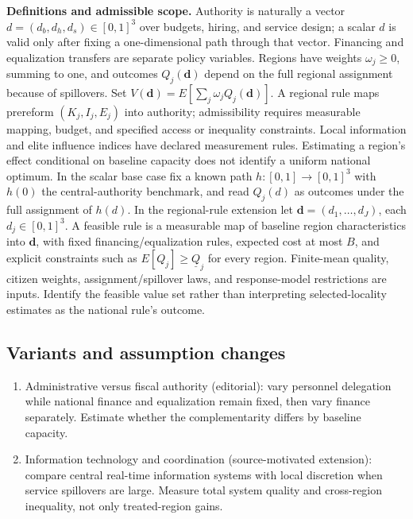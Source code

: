\documentclass[11pt,a4paper]{article}
\begin{document}
\textbf{Definitions and admissible scope.} Authority is naturally a vector \(d=(d_b,d_h,d_s)\in[0,1]^3\) over budgets, hiring, and service design; a scalar \(d\) is valid only after fixing a one-dimensional path through that vector. Financing and equalization transfers are separate policy variables. Regions have weights \(\omega_j\ge0\), summing to one, and outcomes \(Q_j(\mathbf d)\) depend on the full regional assignment because of spillovers. Set \(V(\mathbf d)=E[\sum_j\omega_jQ_j(\mathbf d)]\). A regional rule maps prereform \((K_j,I_j,E_j)\) into authority; admissibility requires measurable mapping, budget, and specified access or inequality constraints. Local information and elite influence indices have declared measurement rules. Estimating a region's effect conditional on baseline capacity does not identify a uniform national optimum. In the scalar base case fix a known path \(h:[0,1]\to[0,1]^3\) with \(h(0)\) the central-authority benchmark, and read \(Q_j(d)\) as outcomes under the full assignment of \(h(d)\). In the regional-rule extension let \(\mathbf d=(d_1,\ldots,d_J)\), each \(d_j\in[0,1]^3\). A feasible rule is a measurable map of baseline region characteristics into \(\mathbf d\), with fixed financing/equalization rules, expected cost at most \(B\), and explicit constraints such as \(E[Q_j]\ge\underline Q_j\) for every region. Finite-mean quality, citizen weights, assignment/spillover laws, and response-model restrictions are inputs. Identify the feasible value set rather than interpreting selected-locality estimates as the national rule's outcome.
\subsection*{Variants and assumption changes}
\begin{enumerate}
\item Administrative versus fiscal authority (editorial): vary personnel delegation while national finance and equalization remain fixed, then vary finance separately. Estimate whether the complementarity differs by baseline capacity.
\item Information technology and coordination (source-motivated extension): compare central real-time information systems with local discretion when service spillovers are large. Measure total system quality and cross-region inequality, not only treated-region gains.
\end{enumerate}
\end{document}
